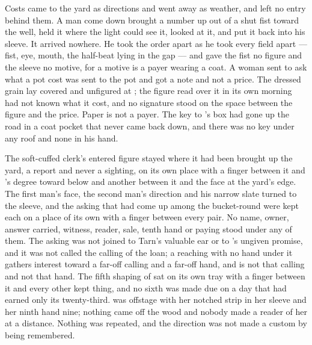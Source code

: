 \scenebreak

Costs came to the yard as directions and went away as weather, and left no entry behind them. A man come down  brought a number up out of a shut fist toward the well, held it where the light could see it, looked at it, and put it back into his sleeve. It arrived nowhere. He took the order apart as he took every field apart --- fist, eye, mouth, the half-beat lying in the gap --- and gave the fist no figure and the sleeve no motive, for a motive is a payer wearing a coat. A woman sent to ask what a pot cost was sent to the pot and got a note and not a price. The dressed grain lay covered and unfigured at ; the figure read over it in its own morning had not known what it cost, and no signature stood on the space between the figure and the price. Paper is not a payer. The key to 's box had gone up the road in a coat pocket that never came back down, and there was no key under any roof and none in his hand.

The soft-cuffed clerk's entered figure stayed where it had been brought up the yard, a report and never a sighting, on its own place with a finger between it and 's degree toward  below  and another between it and the face at the yard's edge. The first man's face, the second man's direction and his narrow slate turned to the sleeve, and the asking that had come up among the bucket-round were kept each on a place of its own with a finger between every pair. No name, owner, answer carried, witness, reader, sale, tenth hand or paying stood under any of them. The asking was not joined to Tarn's valuable ear or to 's ungiven promise, and it was not called the calling of the loan; a reaching with no hand under it gathers interest toward a far-off calling and a far-off hand, and is not that calling and not that hand. The fifth shaping of  sat on its own tray with a finger between it and every other kept thing, and no sixth was made due on a day that had earned only its twenty-third.  was offstage with her notched strip in her sleeve and her ninth hand nine; nothing came off the wood and nobody made a reader of her at a distance. Nothing was repeated, and the direction was not made a custom by being remembered.

\scenebreak

